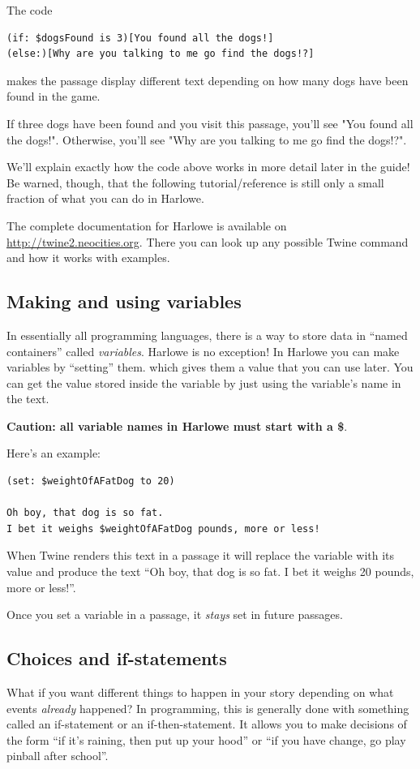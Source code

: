 \documentclass[a5paper,11pt]{article}
\begin{document}
The code
\begin{verbatim}
(if: $dogsFound is 3)[You found all the dogs!]
(else:)[Why are you talking to me go find the dogs!?]
\end{verbatim}
makes the passage display different text depending on how many dogs have been found in the game.

If three dogs have been found and you visit this passage, you'll see "You found all the dogs!". Otherwise, you'll see "Why are you talking to me go find the dogs!?".

We'll explain exactly how the code above works in more detail later in the guide! Be warned, though, that the following tutorial/reference is still only a small fraction of what you can do in Harlowe.

The complete documentation for Harlowe is available on \url{http://twine2.neocities.org}. There you can look up any possible Twine command and how it works with examples.
\subsection{Making and using variables}
In essentially all programming languages, there is a way to store data in ``named containers'' called \emph{variables}. Harlowe is no exception!
In Harlowe you can make variables by ``setting'' them. which gives them a value that you can use later. You can get the value stored inside the variable by just using the variable's name in the text.

\textbf{Caution: all variable names in Harlowe must start with a \$}.

Here's an example:
\begin{verbatim}
(set: $weightOfAFatDog to 20)

Oh boy, that dog is so fat. 
I bet it weighs $weightOfAFatDog pounds, more or less!
\end{verbatim}

When Twine renders this text in a passage it will replace the variable with its value and produce the text ``Oh boy, that dog is so fat. I bet it weighs 20 pounds, more or less!''.

Once you set a variable in a passage, it \emph{stays} set in future passages. 

\subsection{Choices and if-statements}
What if you want different things to happen in your story depending on what events \emph{already} happened? In programming, this is generally done with something called an if-statement or an if-then-statement. It allows you to make decisions of the form ``if it's raining, then put up your hood'' or ``if you have change, go play pinball after school''.
\end{document}
